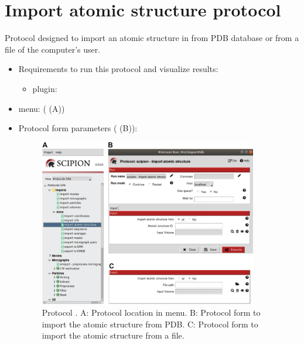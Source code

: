\section{Import atomic structure protocol}
\label{app:importAtomicStructure}%
Protocol designed to import an atomic structure in \scipion from PDB database or from a file of the computer's user.
   
 \begin{itemize}
  \item Requirements to run this protocol and visualize results:
    \begin{itemize}
        \item \scipion plugin: 
    \end{itemize}
  \item \scipion menu:
   ( (A))
  
  \item Protocol form parameters ( (B)):
  
  \begin{figure}[H]
    \centering 
    \captionsetup{width=.7\linewidth} 
    \includegraphics[width=0.90\textwidth]{Images_appendix/Fig110.pdf}
    \caption{Protocol . A: Protocol location in \scipion menu. B: Protocol form to import the atomic structure from PDB. C: Protocol form to import the atomic structure from a file.}
    \label{fig:app_protocol_atomicStructure_1}
   \end{figure}


\end{itemize}
